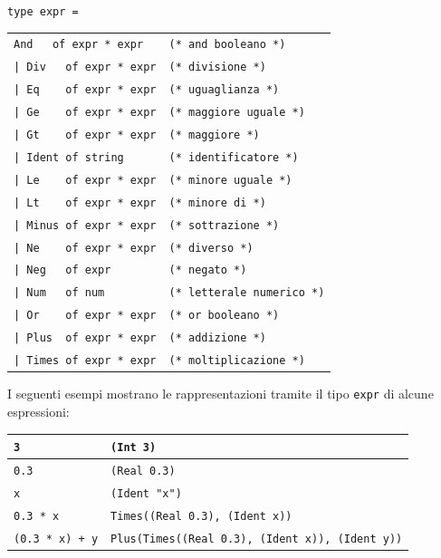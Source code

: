 \documentclass[a4paper,10pt]{article}
\begin{document}
\verb|type expr =|
\begin{center}
\begin{tabular}{l l}
    \verb|And   of expr * expr|	& \verb|(* and booleano *)| \\
    \verb#| Div   of expr * expr# & \verb|(* divisione *)| \\
    \verb#| Eq    of expr * expr#& \verb|(* uguaglianza *)| \\
    \verb#| Ge    of expr * expr#& \verb|(* maggiore uguale *)| \\
    \verb#| Gt    of expr * expr#& \verb|(* maggiore *)| \\
    \verb#| Ident of string#	&\verb|(* identificatore *)| \\
    \verb#| Le    of expr * expr#&\verb|(* minore uguale *)| \\
    \verb#| Lt    of expr * expr#&\verb|(* minore di *)| \\
    \verb#| Minus of expr * expr#&\verb|(* sottrazione *)| \\
    \verb#| Ne    of expr * expr#&\verb|(* diverso *)| \\
    \verb#| Neg   of expr#	&\verb|(* negato *)|\\
    \verb#| Num   of num#	&\verb|(* letterale numerico *)|\\
    \verb#| Or    of expr * expr#&\verb|(* or booleano *)|\\
    \verb#| Plus  of expr * expr#&\verb|(* addizione *)|\\
    \verb#| Times of expr * expr#&\verb|(* moltiplicazione *)|\\
\end{tabular}
\end{center}

I seguenti esempi mostrano le rappresentazioni tramite il tipo \verb|expr| di
alcune espressioni:\\
\begin{center}
\begin{tabular}{|l|l|}
\hline
\verb|3| & \verb|(Int 3)| \\
\hline
\verb|0.3| & \verb|(Real 0.3)| \\
\hline
\verb|x| & \verb|(Ident "x")| \\
\hline
\verb|0.3 * x| & \verb|Times((Real 0.3), (Ident x))| \\
\hline
\verb|(0.3 * x) + y| &
\verb|Plus(Times((Real 0.3), (Ident x)), (Ident y))| \\
\hline
\end{tabular} 
\end{center}
\end{document}

